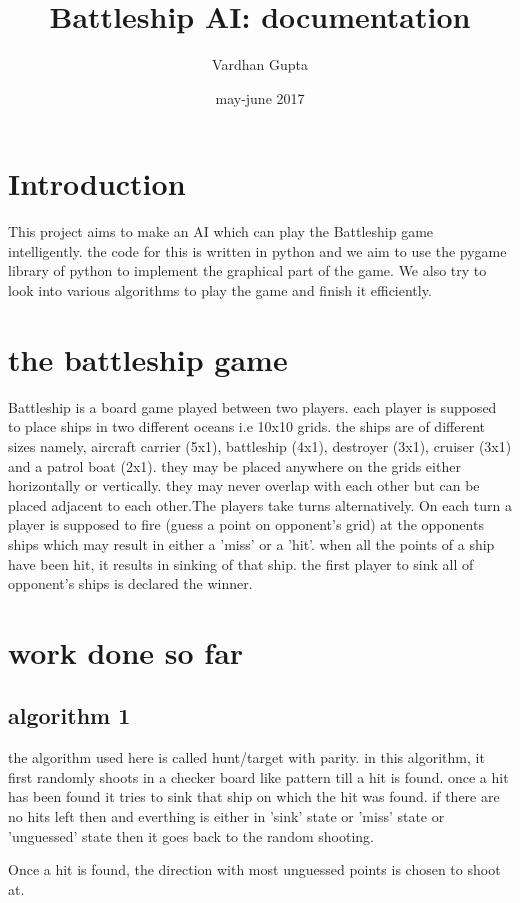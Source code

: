 \documentclass{article}
\title{Battleship AI: documentation}
\author{Vardhan Gupta}
\date{may-june 2017}
\begin{document}
   \maketitle
   \tableofcontents
   \section{Introduction}
   This project aims to make an AI which can play the Battleship game intelligently. the code for this is written in python and we aim to use the pygame library of python to implement the graphical part of the game. We also try to look into various algorithms to play the game and finish it efficiently.
   
   \section{the battleship game}
   Battleship is a board game played between two players. each player is supposed to place ships in two different oceans i.e 10x10 grids. the ships are of different sizes namely, aircraft carrier (5x1), battleship (4x1), destroyer (3x1), cruiser (3x1) and a patrol boat (2x1). they may be placed anywhere on the grids either horizontally or vertically. they may never overlap with each other but can be placed adjacent to each other.The players take turns alternatively. On each turn a player is supposed to fire (guess a point on opponent's grid) at the opponents ships which may result in either a 'miss' or a 'hit'. when all the points of a ship have been hit, it results in sinking of that ship. the first player to sink all of opponent's ships is declared the winner.
   
   \section{work done so far}
   
   \subsection{algorithm 1}
   the algorithm used here is called hunt/target with parity. in this algorithm, it first randomly shoots in a checker board like pattern till a hit is found. once a hit has been found it tries to sink that ship on which the hit was found. if there are no hits left then and everthing is either in 'sink' state or 'miss' state or 'unguessed' state then it goes back to the random shooting.
   
   Once a hit is found, the direction with most unguessed points is chosen to shoot at.
\end{document}
